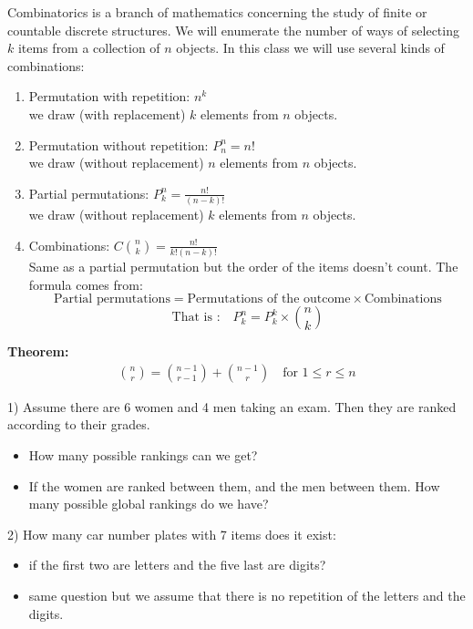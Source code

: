 \documentclass[12pt,a4paper,titlepage]{article}\usepackage[]{graphicx}\usepackage[]{color}
\begin{document}
Combinatorics is a branch of mathematics concerning the study of finite or countable discrete structures.
We will enumerate the number of ways of selecting $k$ items from a collection of $n$ objects.
In this class we will use several kinds of combinations:
\begin{enumerate}
  \item Permutation with repetition: $n^k$  \\
  we draw (with replacement) $k$ elements from $n$ objects.
  \item Permutation without repetition: $P^n_n=n!$ \\
  we draw (without replacement) $n$ elements from $n$ objects.
  \item Partial permutations: $P^n_k=\frac{n!}{(n-k)!}$ \\
  we draw (without replacement) $k$ elements from $n$ objects.
  \item Combinations: $C{n \choose k}=\frac{n!}{k!(n-k)!}$ \\
  Same as a partial permutation but the order of the items doesn't count.
  The formula comes from:
  $$ \text{Partial permutations}= \text{Permutations of the outcome} \times \text{Combinations}$$
$$ \text{That is :} \quad P^n_k=P^k_k \times {n \choose k} $$
\end{enumerate}

\textbf{Theorem:}
\begin{align}
{n \choose r}={n-1 \choose r-1}+{n-1 \choose r} \quad \text{for } 1\leq r\leq n
\end{align}

\vspace{1cm}

1) Assume there are 6 women and 4 men taking an exam. Then they are ranked according to their grades.
\begin{itemize}
  \item How many possible rankings can we get?
  \item If the women are ranked between them, and the men between them. How many possible global rankings do we have?
\end{itemize}

2) How many car number plates with 7 items does it exist:
\begin{itemize}
  \item if the first two are letters and the five last are digits?
  \item same question but we assume that there is no repetition of the letters and the digits.
\end{itemize}
\end{document}
